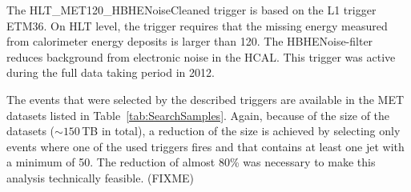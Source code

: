 %
\renewcommand{\arraystretch}{1.5}
\begin{table}[!b]
\centering
\caption{\met and \met+ jet triggers used in this analysis together with the corresponding recorded integrated luminosity during the time when they were in place.}
\label{tab:triggers}
\end{table}  

The HLT\_MET120\_HBHENoiseCleaned trigger is based on the L1 trigger ETM36. %
On HLT level, the trigger requires that the missing energy measured from calorimeter energy deposits is larger than 120\gev.
The HBHENoise-filter reduces background from electronic noise in the HCAL.
This trigger was active during the full data taking period in 2012.

\renewcommand{\arraystretch}{1.5}
\begin{table}[!t]
\centering
\caption{MET data samples used in the search with the contained integrated luminosity.}
\label{tab:SearchSamples}
\end{table}  
The events that were selected by the described triggers are available in the MET datasets listed in Table~\ref{tab:SearchSamples}.
Again, because of the size of the datasets ($\sim150\,$TB in total), a reduction of the size is achieved by selecting only events where one of the used triggers fires and that contains at least one jet with a minimum \pt of 50\gev.
The reduction of almost 80\% was necessary to make this analysis technically feasible. (FIXME)

